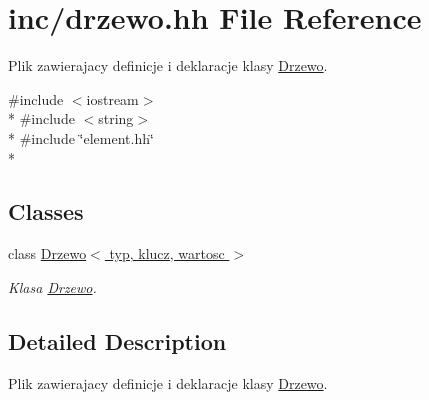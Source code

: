 \hypertarget{drzewo_8hh}{\section{inc/drzewo.hh File Reference}
\label{drzewo_8hh}
}


Plik zawierajacy definicje i deklaracje klasy \hyperlink{class_drzewo}{Drzewo}.  


{\ttfamily \#include $<$iostream$>$}\\*
{\ttfamily \#include $<$string$>$}\\*
{\ttfamily \#include \char`\"{}element.\-hh\char`\"{}}\\*
\subsection*{Classes}
\begin{DoxyCompactItemize}
\item 
class \hyperlink{class_drzewo}{Drzewo$<$ typ, klucz, wartosc $>$}
\begin{DoxyCompactList}\small\item\em Klasa \hyperlink{class_drzewo}{Drzewo}. \end{DoxyCompactList}\end{DoxyCompactItemize}


\subsection{Detailed Description}
Plik zawierajacy definicje i deklaracje klasy \hyperlink{class_drzewo}{Drzewo}. 